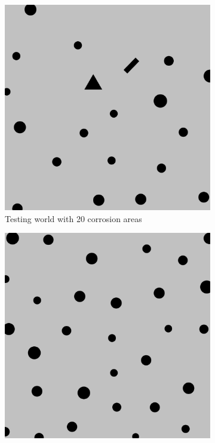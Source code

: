 \documentclass[francais,RandD]{rapportPFE}
\begin{document}
\begin{figure}[h!]
\begin{subfigure}[t]{0.15\linewidth}
				\includegraphics[width=\linewidth]{graphics/test_model_20_1.png}
				\caption{Testing world with 20 corrosion areas}
				\label{fig:test_model_20_1}
			\end{subfigure}
			\hfill
			\begin{subfigure}[t]{0.15\linewidth}
				\centering
				\includegraphics[width=\linewidth]{graphics/test_model_30_1.png}

\end{subfigure}
\end{figure}
\end{document}
